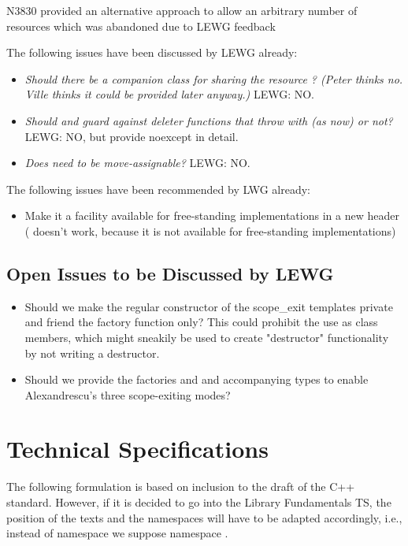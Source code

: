\documentclass[ebook,11pt,article]{memoir}
\begin{document}
N3830 provided an alternative approach to allow an arbitrary number of resources which was abandoned due to LEWG feedback 

The following issues have been discussed by LEWG already:
\begin{itemize}
\item \textit{Should there be a companion class for sharing the resource  ?  (Peter thinks no. Ville thinks it could be provided later anyway.) } LEWG: NO.
\item \textit{Should  and  guard against deleter functions that throw with  (as now) or not?} LEWG: NO, but provide noexcept in detail.
\item \textit{Does  need to be move-assignable? } LEWG: NO.
\end{itemize}

The following issues have been recommended by LWG already:
\begin{itemize}
\item Make it a facility available for free-standing implementations in a new header  ( doesn't work, because it is not available for free-standing implementations)
\end{itemize}


\section{Open Issues to be Discussed by LEWG}
\begin{itemize}
\item Should we make the regular constructor of the scope_exit templates private and friend the factory function only? This could prohibit the use as class members, which might sneakily be used to create "destructor" functionality by not writing a destructor.
\item Should we provide the factories  and  and accompanying types to enable Alexandrescu's three scope-exiting modes?
\end{itemize}


\chapter{Technical Specifications}
The following formulation is based on inclusion to the draft of the C++ standard. However, if it is decided to go into the Library Fundamentals TS, the position of the texts and the namespaces will have to be adapted accordingly, i.e., instead of namespace  we suppose namespace .
\end{document}
